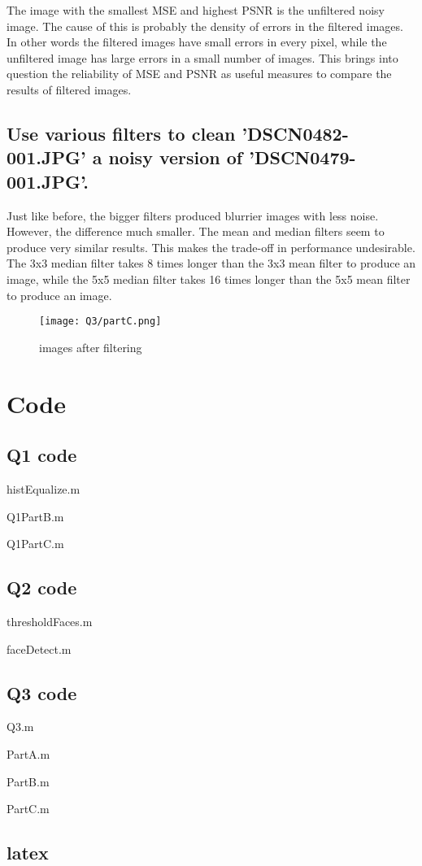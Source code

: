 \documentclass{article}
\begin{document}
	
	The image with the smallest MSE and highest PSNR is the unfiltered noisy image. The cause of this is probably the density of errors in the filtered images. In other words the filtered images have small errors in every pixel, while the unfiltered image has large errors in a small number of images. This brings into question the reliability of MSE and PSNR as useful measures to compare the results of filtered images.
	
	
	\subsection{Use various filters to clean 'DSCN0482-001.JPG' a noisy version of 'DSCN0479-001.JPG'.}
	
	
	Just like before, the bigger filters produced blurrier images with less noise. However, the difference much smaller. The mean and median filters seem to produce very similar results. This makes the trade-off in performance undesirable. The 3x3 median filter takes 8 times longer than the 3x3 mean filter to produce an image, while the 5x5 median filter takes 16 times longer than the 5x5 mean filter to produce an image.
	
	
	\begin{figure}[H]
		\texttt{[image: Q3/partC.png]}
		\caption{images after filtering}
	\end{figure}
	
	\newpage
	\section{Code}
	\subsection{Q1 code}
	histEqualize.m
	
	
	Q1PartB.m
	
	
	Q1PartC.m
	
	
	\newpage
	\subsection{Q2 code}
	thresholdFaces.m
	
	
	faceDetect.m
	
	
	\newpage
	\subsection{Q3 code}
	Q3.m
	
	
	PartA.m
	
	
	PartB.m
	
	
	PartC.m
	
	
	\newpage
	\subsection{latex}
	
\end{document}
